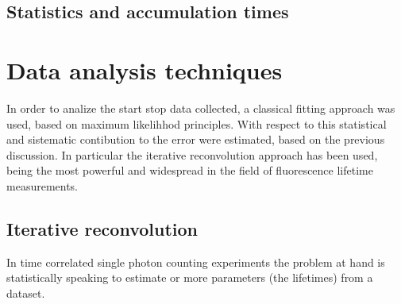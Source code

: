 



\subsection{Statistics and accumulation times}


\section{Data analysis techniques}
In order to analize the start stop data collected, a classical fitting approach was used, based on maximum likelihhod principles.
With respect to this statistical and sistematic contibution to the error were estimated, based on the previous discussion.
In particular the iterative reconvolution approach has been used, being the most powerful and widespread in the field of fluorescence lifetime measurements.

\subsection{Iterative reconvolution}
In time correlated single photon counting experiments the problem at hand is statistically speaking to estimate or more parameters (the lifetimes) from a dataset.

